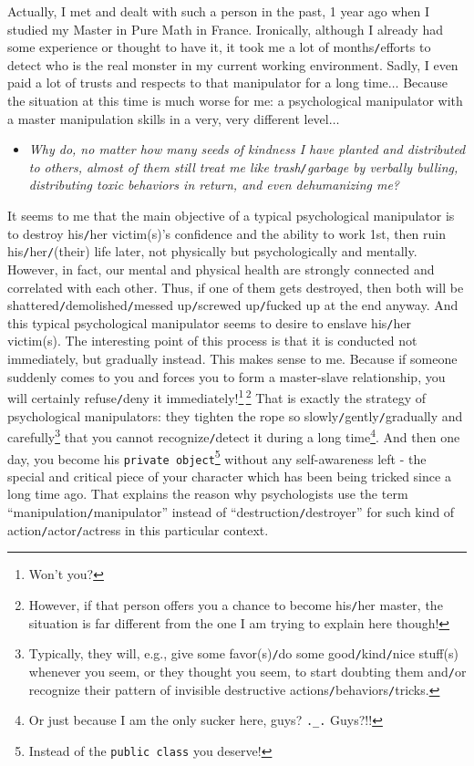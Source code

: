 \documentclass[12pt]{article}
\begin{document}
Actually, I met and dealt with such a person in the past, 1 year ago when I studied my Master in Pure Math in France. Ironically, although I already had some experience or thought to have it, it took me a lot of months{\tt/}efforts to detect who is the real monster in my current working environment. Sadly, I even paid a lot of trusts and respects to that manipulator for a long time$\ldots$ Because the situation at this time is much worse for me: a psychological manipulator with a master manipulation skills in a very, very different level$\ldots$
\begin{itemize}
	\item {\it Why do, no matter how many seeds of kindness I have planted and distributed to others, almost of them still treat me like trash{\tt/}garbage by verbally bulling, distributing toxic behaviors in return, and even dehumanizing me?}
\end{itemize}
It seems to me that the main objective of a typical psychological manipulator is to destroy his{\tt/}her victim(s)'s confidence and the ability to work 1st, then ruin his{\tt/}her{\tt/}(their) life later, not physically but psychologically and mentally. However, in fact, our mental and physical health are strongly connected and correlated with each other. Thus, if one of them gets destroyed, then both will be shattered{\tt/}demolished{\tt/}messed up{\tt/}screwed up{\tt/}fucked up at the end anyway. And this typical psychological manipulator seems to desire to enslave his{\tt/}her victim(s). The interesting point of this process is that it is conducted not immediately, but gradually instead. This makes sense to me. Because if someone suddenly comes to you and forces you to form a master-slave relationship, you will certainly refuse{\tt/}deny it immediately!\footnote{Won't you?}\,\footnote{However, if that person offers you a chance to become his{\tt/}her master, the situation is far different from the one I am trying to explain here though!} That is exactly the strategy of psychological manipulators: they tighten the rope so slowly{\tt/}gently{\tt/}gradually and carefully\footnote{Typically, they will, e.g., give some favor(s){\tt/}do some good{\tt/}kind{\tt/}nice stuff(s) whenever you seem, or they thought you seem, to start doubting them and{\tt/}or recognize their pattern of invisible destructive actions{\tt/}behaviors{\tt/}tricks.} that you cannot recognize{\tt/}detect it during a long time\footnote{Or just because I am the only sucker here, guys? \texttt{.\_.} Guys?!!}. And then one day, you become his \texttt{private object}\footnote{Instead of the \texttt{public class} you deserve!} without any self-awareness left - the special and critical piece of your character which has been being tricked since a long time ago. That explains the reason why psychologists use the term ``manipulation{\tt/}manipulator'' instead of ``destruction{\tt/}destroyer'' for such kind of action{\tt/}actor{\tt/}actress in this particular context.
\end{document}
